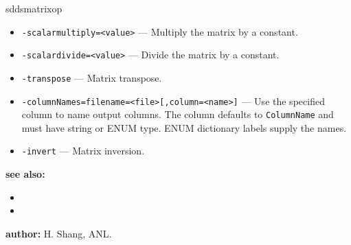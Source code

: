 \begin{sddsprog}{sddsmatrixop}
\begin{itemize}
      \item \verb|-scalarmultiply=<value>| --- Multiply the matrix by a constant.
      \item \verb|-scalardivide=<value>| --- Divide the matrix by a constant.
      \item \verb|-transpose| --- Matrix transpose.
      \item \verb|-columnNames=filename=<file>[,column=<name>]| --- Use the specified column to name output columns. The column defaults to \verb|ColumnName| and must have string or ENUM type. ENUM dictionary labels supply the names.
      \item \verb|-invert| --- Matrix inversion.
    \end{itemize}
  \item \textbf{see also:}
    \begin{itemize}
      \item {}
      \item {}
    \end{itemize}
  \item \textbf{author:} H. Shang, ANL.
\end{sddsprog}

